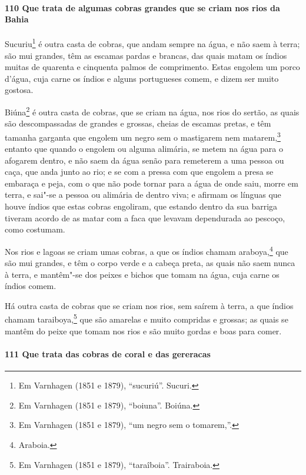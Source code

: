 \paragraph{110 Que trata de algumas cobras grandes que se criam nos rios da Bahia}

Sucuriu\footnote{ Em Varnhagen (1851 e 1879), ``sucuriú''. Sucuri.} é outra casta de
cobras, que andam sempre na água, e não saem à terra; são mui grandes, têm as escamas
pardas e brancas, das quais matam os índios muitas de quarenta e cinquenta palmos de
comprimento. Estas engolem um porco d'água, cuja carne os índios e alguns portugueses
comem, e dizem ser muito gostosa.

Biúna\footnote{ Em Varnhagen (1851 e 1879), ``boiuna''. Boiúna.} é outra casta de cobras,
que se criam na água, nos rios do sertão, as quais são descompassadas de grandes e
grossas, cheias de escamas pretas, e têm tamanha garganta que engolem um negro sem o
mastigarem nem matarem,\footnote{ Em Varnhagen (1851 e 1879), ``um negro sem o
tomarem,''.} entanto que quando o engolem ou alguma alimária, se metem na água para o
afogarem dentro, e não saem da água senão para remeterem a uma pessoa ou caça, que anda
junto ao rio; e se com a pressa com que engolem a presa se embaraça e peja, com o que não
pode tornar para a água de onde saiu, morre em terra, e sai"-se a pessoa ou alimária de
dentro viva; e afirmam os línguas que houve índios que estas cobras engoliram, que estando
dentro da sua barriga tiveram acordo de as matar com a faca que levavam dependurada ao
pescoço, como costumam.

Nos rios e lagoas se criam umas cobras, a que os índios chamam araboya,\footnote{
Araboia.} que são mui grandes, e têm o corpo verde e a cabeça preta, as quais não saem
nunca à terra, e mantêm"-se dos peixes e bichos que tomam na água, cuja carne os índios
comem.

Há outra casta de cobras que se criam nos rios, sem saírem à terra, a que índios chamam
taraiboya,\footnote{ Em Varnhagen (1851 e 1879), ``taraîboia''. Trairaboia.} que são
amarelas e muito compridas e grossas; as quais se mantêm do peixe que tomam nos rios e são
muito gordas e boas para comer.

\paragraph{111 Que trata das cobras de coral e das gereracas}

